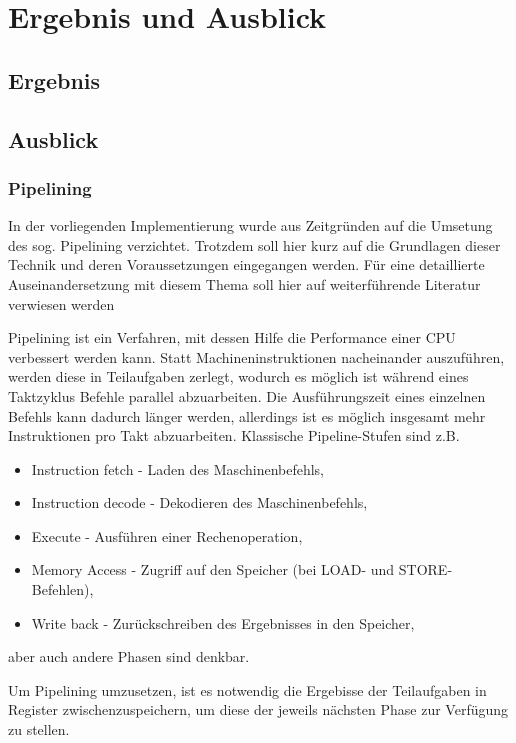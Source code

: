 \chapter{Ergebnis und Ausblick} %
\label{Ergebnis} %

\section{Ergebnis}
\section{Ausblick}

\subsection{Pipelining}
In der vorliegenden Implementierung wurde aus Zeitgründen auf die Umsetung des sog. Pipelining verzichtet. 
Trotzdem soll hier kurz auf die Grundlagen dieser Technik und deren Voraussetzungen eingegangen werden.
Für eine detaillierte Auseinandersetzung mit diesem Thema soll hier auf weiterführende Literatur verwiesen werden~\cite[A.1]{Hennessy}

Pipelining ist ein Verfahren, mit dessen Hilfe die Performance einer CPU verbessert werden kann.
Statt Machineninstruktionen nacheinander auszuführen, werden diese in Teilaufgaben zerlegt, wodurch es möglich ist während eines Taktzyklus Befehle parallel abzuarbeiten.
Die Ausführungszeit eines einzelnen Befehls kann dadurch länger werden, allerdings ist es möglich insgesamt mehr Instruktionen pro Takt abzuarbeiten.
Klassische Pipeline-Stufen sind z.B.
\begin{itemize}
    \item Instruction fetch - Laden des Maschinenbefehls,
    \item Instruction decode - Dekodieren des Maschinenbefehls,
    \item Execute - Ausführen einer Rechenoperation,
    \item Memory Access - Zugriff auf den Speicher (bei LOAD- und STORE-Befehlen),
    \item Write back - Zurückschreiben des Ergebnisses in den Speicher,
\end{itemize}
aber auch andere Phasen sind denkbar.

Um Pipelining umzusetzen, ist es notwendig die Ergebisse der Teilaufgaben in Register zwischenzuspeichern, um diese der jeweils nächsten Phase zur Verfügung zu stellen.







